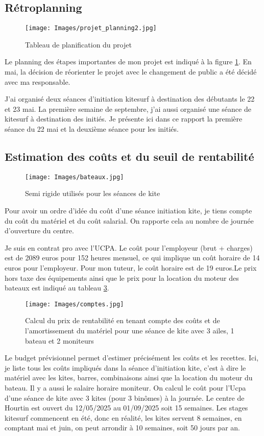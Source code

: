 \documentclass[11pt,a4paper]{report}
\begin{document}
\subsection{Rétroplanning}
\begin{figure}[h]
\centering
\texttt{[image: Images/projet\_planning2.jpg]} 
\caption{Tableau de planification du projet \label{gantt}}
\end{figure}
Le planning des étapes importantes de mon projet est indiqué
à la figure \ref{gantt}. En mai, la décision de  réorienter 
le projet avec le changement de public a été décidé avec
ma responsable. 

J'ai organisé deux séances d'initiation kitesurf à destination des
débutants le 22 et 23 mai. La première semaine de septembre, j'ai 
aussi organisé une séance de kitesurf à destination des initiés.
Je présente ici dans ce rapport la première séance du 22 mai et la
deuxième séance pour les initiés.

\subsection{Estimation des co\^uts et du seuil de rentabilité}

\begin{figure}
\centering
\texttt{[image: Images/bateaux.jpg]} 
\caption{Semi rigide utilisés pour les séances de kite\label{bateaux}}
\end{figure}
Pour avoir un ordre d'idée du coût d'une séance initiation kite, je
tiens compte du co\^ut du matériel et du co\^ut salarial. On rapporte 
cela au nombre de journée d'ouverture du centre.

Je suis en contrat pro avec l'UCPA. Le coût pour
l'employeur (brut + charges) est de 2089 euros pour 152 heures mensuel, 
ce qui implique un coût horaire de 14 euros pour l'employeur.
Pour mon tuteur, le coût horaire est de 19 euros.Le prix hors taxe
des équipements ainsi que le prix pour la location du moteur des
bateaux est indiqué au tableau \ref{couts}.

\begin{figure}
\texttt{[image: Images/comptes.jpg]} 
\caption{Calcul du prix de rentabilité en tenant compte
des co\^uts et de l'amortissement du matériel pour une séance de kite
avec 3 ailes, 1 bateau et 2 moniteurs\label{couts}}
\end{figure}

Le budget prévisionnel permet d'estimer précisément les co\^uts et les recettes.
Ici, je liste tous les coûts impliqués dans la séance d’initiation kite, 
c'est  à dire le matériel avec les kites, barres, combinaisons ainsi que
la location du moteur du bateau. Il y a aussi le salaire horaire moniteur. 
On calcul le coût pour l'Ucpa
d'une séance de kite avec 3 kites (pour 3 binômes) à la journée.
Le centre de Hourtin est ouvert du 12/05/2025 au 01/09/2025 soit 15 semaines. 
Les stages kitesurf commencent en été, donc en réalité, les kites servent
8 semaines, en comptant mai et juin, on peut arrondir à 10 semaines, soit 50 jours
par an.
\end{document}
